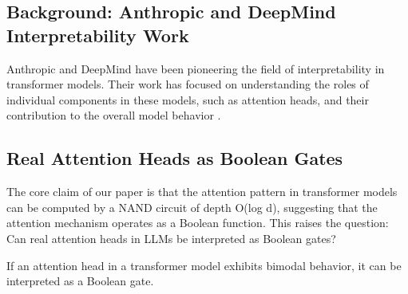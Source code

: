 \subsection{Background: Anthropic and DeepMind Interpretability Work}






Anthropic and DeepMind have been pioneering the field of interpretability in transformer models. Their work has focused on understanding the roles of individual components in these models, such as attention heads, and their contribution to the overall model behavior \cite{anthropic2020, deepmind2020}.













\subsection{Real Attention Heads as Boolean Gates}






The core claim of our paper is that the attention pattern in transformer models can be computed by a NAND circuit of depth O(log d), suggesting that the attention mechanism operates as a Boolean function. This raises the question: Can real attention heads in LLMs be interpreted as Boolean gates?













\begin{theorem}






If an attention head in a transformer model exhibits bimodal behavior, it can be interpreted as a Boolean gate.






\end{theorem}














